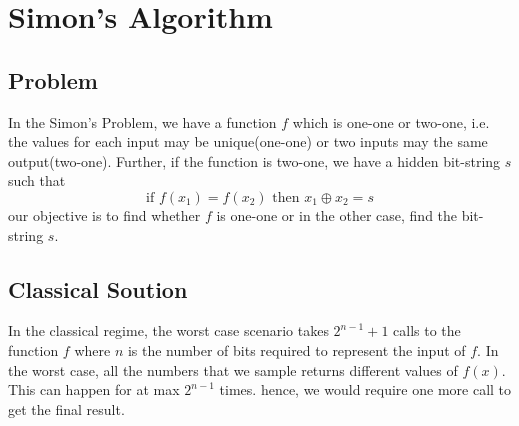 \chapter{Simon's Algorithm}
\section{Problem}
In the Simon's Problem, we have a function $f$ which is one-one or two-one, i.e. the values for each input may be unique(one-one) or two inputs may the same output(two-one). Further, if the function is two-one, we have a hidden bit-string $s$ such that\begin{equation}
\text{if } f(x_1) = f(x_2) \text{ then } x_1\oplus x_2 = s
\end{equation}our objective is to find whether $f$ is one-one or in the other case, find the bit-string $s$.
\section{Classical Soution}
In the classical regime, the worst case scenario takes $2^{n-1} + 1$ calls to the function $f$ where $n$ is the number of bits required to represent the input of $f$. In the worst case, all the numbers that we sample returns different values of $f(x)$. This can happen for at max $2^{n-1}$ times. hence, we would require one more call to get the final result. 
